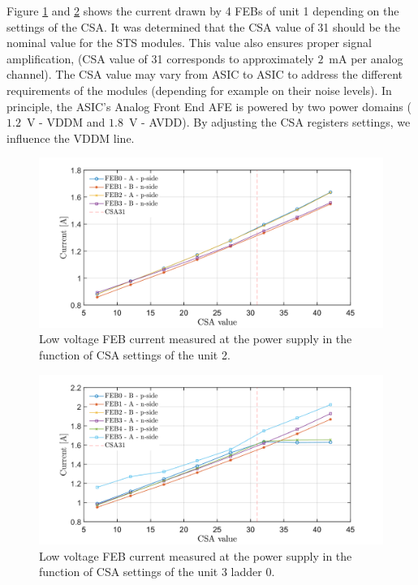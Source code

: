 \newpage
Figure \ref{fig_power3} and \ref{fig_power4} shows the current drawn by 4 \glspl{FEB} of unit 1 depending on the settings of the \gls{CSA}. It was determined that the \gls{CSA} value of 31 should be the nominal value for the \gls{STS} modules. This value also ensures proper signal amplification, (\gls{CSA} value of 31 corresponds to approximately $2$~mA per analog channel). The \gls{CSA} value may vary from \gls{ASIC} to \gls{ASIC} to address the different requirements of the modules (depending for example on their noise levels). In principle, the \gls{ASIC}'s Analog Front End \gls{AFE} is powered by two power domains ($1.2$~V - VDDM and $1.8$~V - AVDD). By adjusting the \gls{CSA} registers settings, we influence the VDDM line. 
\begin{figure}[h!]
\centering
\includegraphics[width=0.9\columnwidth]{Chapter6/DCS/images/U0CSABIAS.png}
\caption{Low voltage \gls{FEB} current measured at the power supply in the function of CSA settings of the unit 2. }
\label{fig_power3}
\end{figure}
\begin{figure}[h!]
\centering
\includegraphics[width=0.9\columnwidth]{Chapter6/DCS/images/U3L0CSABIAS.png}
\caption{Low voltage \gls{FEB} current measured at the power supply in the function of CSA settings of the unit 3 ladder 0.}
\label{fig_power4}
\end{figure}

